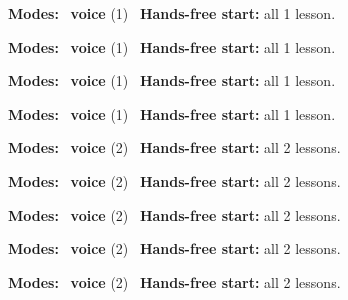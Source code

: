 \expandafter\def\csname hlchaptermodality258\endcsname{%
  {\small\noindent
    \textbf{Modes:} \hlvoicesign{}~\textbf{voice} (1)\quad
    \hlvoicesign{}~\textbf{Hands-free start:} all 1 lesson.%
    \par}\medskip
}

\expandafter\def\csname hlchaptermodality259\endcsname{%
  {\small\noindent
    \textbf{Modes:} \hlvoicesign{}~\textbf{voice} (1)\quad
    \hlvoicesign{}~\textbf{Hands-free start:} all 1 lesson.%
    \par}\medskip
}

\expandafter\def\csname hlchaptermodality260\endcsname{%
  {\small\noindent
    \textbf{Modes:} \hlvoicesign{}~\textbf{voice} (1)\quad
    \hlvoicesign{}~\textbf{Hands-free start:} all 1 lesson.%
    \par}\medskip
}

\expandafter\def\csname hlchaptermodality261\endcsname{%
  {\small\noindent
    \textbf{Modes:} \hlvoicesign{}~\textbf{voice} (1)\quad
    \hlvoicesign{}~\textbf{Hands-free start:} all 1 lesson.%
    \par}\medskip
}

\expandafter\def\csname hlchaptermodality262\endcsname{%
  {\small\noindent
    \textbf{Modes:} \hlvoicesign{}~\textbf{voice} (2)\quad
    \hlvoicesign{}~\textbf{Hands-free start:} all 2 lessons.%
    \par}\medskip
}

\expandafter\def\csname hlchaptermodality263\endcsname{%
  {\small\noindent
    \textbf{Modes:} \hlvoicesign{}~\textbf{voice} (2)\quad
    \hlvoicesign{}~\textbf{Hands-free start:} all 2 lessons.%
    \par}\medskip
}

\expandafter\def\csname hlchaptermodality264\endcsname{%
  {\small\noindent
    \textbf{Modes:} \hlvoicesign{}~\textbf{voice} (2)\quad
    \hlvoicesign{}~\textbf{Hands-free start:} all 2 lessons.%
    \par}\medskip
}

\expandafter\def\csname hlchaptermodality265\endcsname{%
  {\small\noindent
    \textbf{Modes:} \hlvoicesign{}~\textbf{voice} (2)\quad
    \hlvoicesign{}~\textbf{Hands-free start:} all 2 lessons.%
    \par}\medskip
}

\expandafter\def\csname hlchaptermodality266\endcsname{%
  {\small\noindent
    \textbf{Modes:} \hlvoicesign{}~\textbf{voice} (2)\quad
    \hlvoicesign{}~\textbf{Hands-free start:} all 2 lessons.%
    \par}\medskip
}

